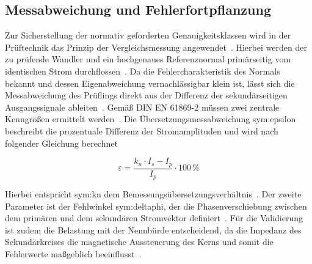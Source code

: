 \subsection{Messabweichung und Fehlerfortpflanzung}
\label{sec:messabweichung_fehlerfortpflanzung}

Zur Sicherstellung der normativ geforderten Genauigkeitsklassen wird in der Prüftechnik das Prinzip der Vergleichsmessung angewendet~\cite{norm-DIN_EN_61869_2-Messwandler_Teil2-DIN}.
Hierbei werden der zu prüfende Wandler und ein hochgenaues Referenznormal primärseitig vom identischen Strom durchflossen~\cite{norm-DIN_EN_61869_2-Messwandler_Teil2-DIN}.
Da die Fehlercharakteristik des Normals bekannt und dessen Eigenabweichung vernachlässigbar klein ist, lässt sich die Messabweichung des Prüflings direkt aus der Differenz der sekundärseitigen Ausgangssignale ableiten~\cite{norm-DIN_EN_61869_2-Messwandler_Teil2-DIN}.
Gemäß DIN EN 61869-2 müssen zwei zentrale Kenngrößen ermittelt werden~\cite{norm-DIN_EN_61869_2-Messwandler_Teil2-DIN}.
Die Übersetzungsmessabweichung \gls{sym:epsilon} beschreibt die prozentuale Differenz der Stromamplituden und wird nach folgender Gleichung berechnet~\cite{norm-DIN_EN_61869_2-Messwandler_Teil2-DIN}

\begin{equation}
    \varepsilon = \frac{k_n \cdot I_{s} - I_{p}}{I_{p}} \cdot 100\,\%
    \label{eq:messabweichung_epsilon}
\end{equation}

Hierbei entspricht \gls{sym:kn} dem Bemessungsübersetzungsverhältnis~\cite{norm-DIN_EN_61869_2-Messwandler_Teil2-DIN}.
Der zweite Parameter ist der Fehlwinkel \gls{sym:deltaphi}, der die Phasenverschiebung zwischen dem primären und dem sekundären Stromvektor definiert~\cite{norm-DIN_EN_61869_2-Messwandler_Teil2-DIN}.
Für die Validierung ist zudem die Belastung mit der Nennbürde entscheidend, da die Impedanz des Sekundärkreises die magnetische Aussteuerung des Kerns und somit die Fehlerwerte maßgeblich beeinflusst~\cite{norm-DIN_EN_61869_2-Messwandler_Teil2-DIN}.
